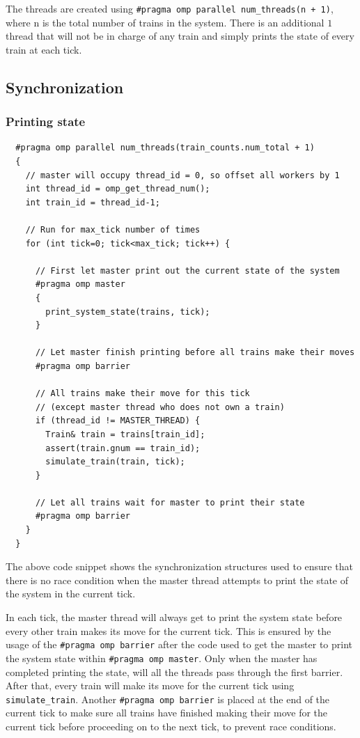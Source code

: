 \documentclass[12pt]{article}
\begin{document}
\bigbreak \noindent The threads are created using \verb!#pragma omp parallel num_threads(n + 1)!, where n is the total number of trains in the system. There is an additional $1$ thread that will not be in charge of any train and simply prints the state of every train at each tick.

\subsection{Synchronization}

\subsubsection{Printing state}

\begin{verbatim}
  #pragma omp parallel num_threads(train_counts.num_total + 1)
  {
    // master will occupy thread_id = 0, so offset all workers by 1
    int thread_id = omp_get_thread_num();
    int train_id = thread_id-1;

    // Run for max_tick number of times
    for (int tick=0; tick<max_tick; tick++) {

      // First let master print out the current state of the system
      #pragma omp master
      {
        print_system_state(trains, tick);
      }

      // Let master finish printing before all trains make their moves
      #pragma omp barrier

      // All trains make their move for this tick
      // (except master thread who does not own a train)
      if (thread_id != MASTER_THREAD) {
        Train& train = trains[train_id];
        assert(train.gnum == train_id);
        simulate_train(train, tick);
      }

      // Let all trains wait for master to print their state
      #pragma omp barrier
    }
  }
\end{verbatim}

\bigbreak \noindent The above code snippet shows the synchronization structures used to ensure that there is no race condition when the master thread attempts to print the state of the system in the current tick.

\bigbreak \noindent In each tick, the master thread will always get to print the system state before every other train makes its move for the current tick. This is ensured by the usage of the \verb!#pragma omp barrier! after the code used to get the master to print the system state within \verb!#pragma omp master!. Only when the master has completed printing the state, will all the threads pass through the first barrier. After that, every train will make its move for the current tick using \verb!simulate_train!. Another \verb!#pragma omp barrier! is placed at the end of the current tick to make sure all trains have finished making their move for the current tick before proceeding on to the next tick, to prevent race conditions.
\end{document}
